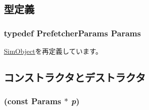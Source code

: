 \subsection{型定義}
\hypertarget{classPrefetcher_aa178e3582d29b08c028c11634875499c}{
\subsubsection[{Params}]{\setlength{\rightskip}{0pt plus 5cm}typedef PrefetcherParams {\bf Params}}}
\label{classPrefetcher_aa178e3582d29b08c028c11634875499c}


\hyperlink{classSimObject_a0f0761d2db586a23bb2a2880b8f387bb}{SimObject}を再定義しています。

\subsection{コンストラクタとデストラクタ}
\hypertarget{classPrefetcher_a103945d22642f41049b79540b7b03773}{
\subsubsection[{Prefetcher}]{ (const {\bf Params} $\ast$ {\em p})}}
\label{classPrefetcher_a103945d22642f41049b79540b7b03773}



